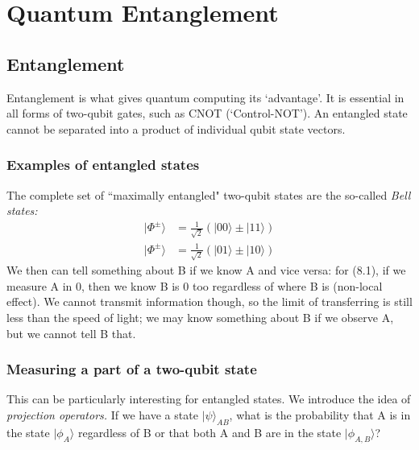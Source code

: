 \documentclass[a4paper, 11pt, normalem]{report}
\begin{document}
\chapter{Quantum Entanglement}
\section{Entanglement}
Entanglement is what gives quantum computing its `advantage'.
It is essential in all forms of two-qubit gates, such as CNOT (`Control-NOT').
An entangled state cannot be separated into a product of individual qubit state vectors.

\subsection{Examples of entangled states}
The complete set of ``maximally entangled" two-qubit states are the so-called \emph{Bell states:}
\begin{align}
    |\Phi^\pm\rangle &= \frac{1}{\sqrt{2}}\left(|00\rangle\pm|11\rangle\right) \\
    |\Phi^\pm\rangle &= \frac{1}{\sqrt{2}}\left(|01\rangle\pm|10\rangle\right)
\end{align}
We then can tell something about B if we know A and vice versa: for (8.1), if we measure A in 0, then we know B is 0 too regardless of where B is (non-local effect).
We cannot transmit information though, so the limit of transferring is still less than the speed of light; we may know something about B if we observe A, but we cannot tell B that.

\subsection{Measuring a part of a two-qubit state}
This can be particularly interesting for entangled states.
We introduce the idea of \emph{projection operators.}
If we have a state $|\psi\rangle_{AB}$, what is the probability that A is in the state $|\phi_A\rangle$ regardless of B or that both A and B are in the state $|\phi_{A,B}\rangle$?
\end{document}
